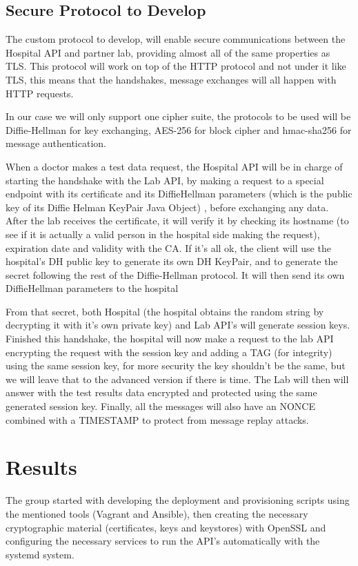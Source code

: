\subsection{Secure Protocol to Develop}
The custom protocol to develop, will enable secure communications between the Hospital API and partner lab, providing almost all of the same properties as TLS.
This protocol will work on top of the HTTP protocol and not under it like TLS, this means that the handshakes, message exchanges will all happen with HTTP requests.

In our case we will only support one cipher suite, the protocols to be used will be Diffie-Hellman for key exchanging, AES-256 for block cipher and hmac-sha256 for message authentication.

When a doctor makes a test data request, the Hospital API will be in charge of starting the handshake with the Lab API, by making a request to a special endpoint with its certificate and its DiffieHellman parameters (which is the public key of its Diffie Helman KeyPair Java Object) , before exchanging any data.  After the lab receives the certificate, it will verify it by checking its hostname (to see if it is actually a valid person in the hospital side making the request), expiration date and validity with the CA. If it's all ok, the client will use the hospital's DH public key to generate its own DH KeyPair, and to generate the secret following the rest of the Diffie-Hellman protocol. It will then send its own DiffieHellman parameters to the hospital  


From that secret, both Hospital (the hospital obtains the random string by decrypting it with it's own private key) and Lab API's will generate session keys. Finished this handshake, the hospital will now make a request to the lab API encrypting the request with the session key and adding a TAG (for integrity) using the same session key, for more security the key shouldn't be the same, but we will leave that to the advanced version if there is time. The Lab will then will answer with the test results data encrypted and protected using the same generated session key. Finally, all the messages will also have an NONCE combined with a TIMESTAMP to protect from message replay attacks. \\


\section{Results}

The group started with developing the deployment and provisioning scripts using the mentioned tools (Vagrant and Ansible), then creating the necessary cryptographic material (certificates, keys and keystores) with OpenSSL and configuring the necessary services to run the API's automatically with the systemd system.

